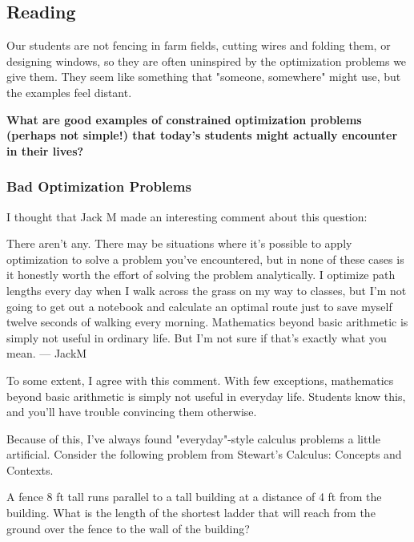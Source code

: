 


\subsection*{Reading}
Our students are not fencing in farm fields, cutting wires and folding them, or designing windows, so they are often uninspired by the
optimization problems we give them. They seem like something that "someone, somewhere" might use, but the examples feel distant.

\textbf{What are good examples of constrained optimization problems (perhaps not simple!) that today's students might actually encounter in their lives?}

\subsubsection*{Bad Optimization Problems}
I thought that Jack M made an interesting comment about this question:

\begin{adjustwidth}{1cm}{}
    There aren't any. There may be situations where it's possible to apply optimization to solve a problem you've encountered, but in none of these cases is it honestly worth the effort of solving the problem analytically. I optimize path lengths every day when I walk across the grass on my way to classes, but I'm not going to get out a notebook and calculate an optimal route just to save myself twelve seconds of walking every morning. Mathematics beyond basic arithmetic is simply not useful in ordinary life. But I'm not sure if that's exactly what you mean. --- JackM
\end{adjustwidth}

To some extent, I agree with this comment. With few exceptions, mathematics beyond basic arithmetic is simply not useful in everyday life. Students know this, and you'll have trouble convincing them otherwise.

Because of this, I've always found "everyday"-style calculus problems a little artificial. Consider the following problem from Stewart's Calculus: Concepts and Contexts.

\begin{adjustwidth}{1cm}{}
    A fence 8 ft tall runs parallel to a tall building at a distance of 4 ft from the building. What is the length of the shortest ladder that will reach from the ground over the fence to the wall of the building?
\end{adjustwidth}

